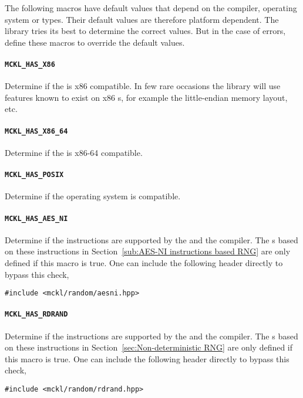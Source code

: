 The following macros have default values that depend on the compiler, operating
system or \cpu types. Their default values are therefore platform dependent.
The library tries its best to determine the correct values. But in the case of
errors, define these macros to override the default values.

\paragraph{\texttt{MCKL\_HAS\_X86}} Determine if the \cpu is x86 compatible. In
few rare occasions the library will use features known to exist on x86 \cpu{}s,
for example the little-endian memory layout, etc.

\paragraph{\texttt{MCKL\_HAS\_X86\_64}} Determine if the \cpu is x86-64
compatible.

\paragraph{\texttt{MCKL\_HAS\_POSIX}} Determine if the operating system is
\posix compatible.

\paragraph{\texttt{MCKL\_HAS\_AES\_NI}} Determine if the \aesni instructions
are supported by the \cpu and the compiler. The \rng{}s based on these
instructions in Section~\ref{sub:AES-NI instructions based RNG} are only
defined if this macro is true. One can include the following header directly to
bypass this check,
\begin{Verbatim}
#include <mckl/random/aesni.hpp>
\end{Verbatim}

\paragraph{\texttt{MCKL\_HAS\_RDRAND}} Determine if the \rdrand instructions
are supported by the \cpu and the compiler. The \rng{}s based on these
instructions in Section~\ref{sec:Non-deterministic RNG} are only defined if
this macro is true. One can include the following header directly to bypass
this check,
\begin{Verbatim}
#include <mckl/random/rdrand.hpp>
\end{Verbatim}

